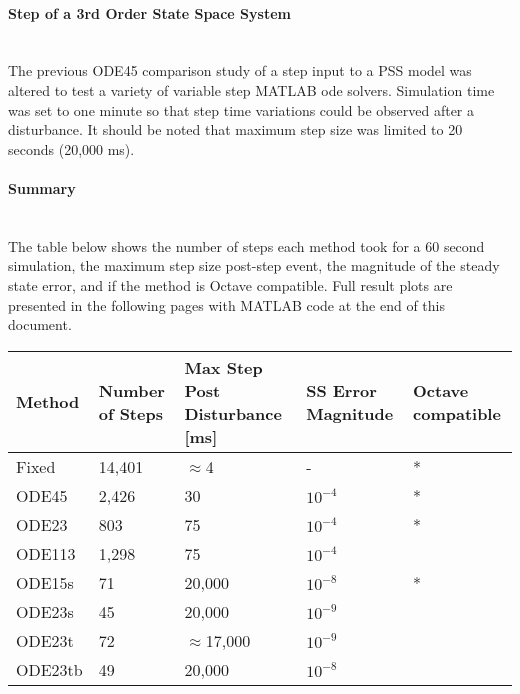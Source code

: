 \documentclass[12pt]{article}
\begin{document}
\onehalfspacing
\paragraph{Step of a 3rd Order State Space System} \ \\
The previous ODE45 comparison study of a step input to a PSS model was altered to test a variety of variable step MATLAB ode solvers.
Simulation time was set to one minute so that step time variations could be observed after a disturbance.
It should be noted that maximum step size was limited to 20 seconds (20,000 ms).

\paragraph{Summary} \ \\
The table below shows the number of steps each method took for a 60 second simulation, the maximum step size post-step event, the magnitude of the steady state error, and if the method is Octave compatible.
Full result plots are presented in the following pages with MATLAB code at the end of this document.

\begin{table}[!ht]
	\centering
	\begin{tabular}{@{} L{2cm} 
	R{2cm} R{4cm}  R{3cm} C{3cm}@{}} 	
		\toprule %
		\footnotesize %
		\raggedright %
Method & 	Number of Steps & 	 Max Step Post Disturbance [ms]	& SS Error Magnitude & Octave compatible\\ \midrule
Fixed & 14,401 & $\approx$4 & - & *\\
ODE45 & 2,426 & 30 & $10^{-4}$ & *\\
ODE23 & 803 & 75 & $10^{-4}$ & * \\
ODE113 & 1,298 & 75 & $10^{-4}$\\
ODE15s & 71 & 20,000 & $10^{-8}$ & *\\
ODE23s & 45 & 20,000 & $10^{-9}$\\
ODE23t & 72 & $\approx$17,000 & $10^{-9}$\\
ODE23tb & 49 & 20,000 & $10^{-8}$\\

		\bottomrule
	\end{tabular}
\end{table}
\end{document}
